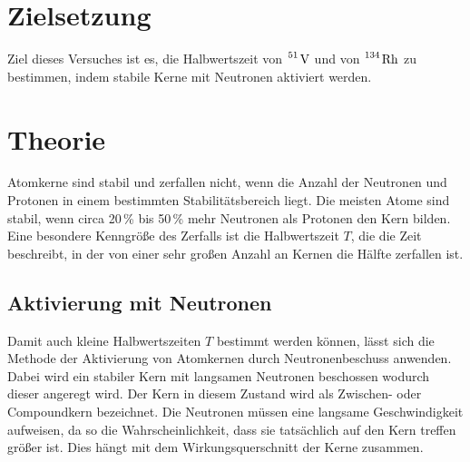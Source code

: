 \section{Zielsetzung}

Ziel dieses Versuches ist es, die Halbwertszeit von $\ce{^51 V}$ und von $\ce{^134 Rh}$ zu bestimmen, indem stabile Kerne
mit Neutronen aktiviert werden.

\section{Theorie}
\label{sec:Theorie}
Atomkerne sind stabil und zerfallen nicht, wenn die Anzahl der Neutronen und Protonen in einem bestimmten 
Stabilitätsbereich liegt. Die meisten Atome sind stabil, wenn circa 20\,\% bis 50\,\% mehr Neutronen als Protonen den Kern bilden.
Eine besondere Kenngröße des Zerfalls ist die Halbwertszeit $T$, die die Zeit beschreibt, in der von einer sehr großen Anzahl
an Kernen die Hälfte zerfallen ist.

\subsection{Aktivierung mit Neutronen}
Damit auch kleine Halbwertszeiten $T$ bestimmt werden können, lässt sich die Methode der Aktivierung von Atomkernen 
durch Neutronenbeschuss anwenden.
Dabei wird ein stabiler Kern mit langsamen Neutronen beschossen wodurch dieser angeregt wird. Der Kern in diesem Zustand 
wird als Zwischen- oder Compoundkern bezeichnet. Die Neutronen müssen eine langsame Geschwindigkeit aufweisen, da so die
Wahrscheinlichkeit, dass sie tatsächlich auf den Kern treffen größer ist. Dies hängt mit dem Wirkungsquerschnitt der Kerne
zusammen.

